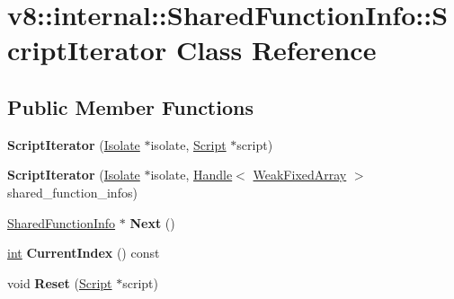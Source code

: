 \hypertarget{classv8_1_1internal_1_1SharedFunctionInfo_1_1ScriptIterator}{}\section{v8\+:\+:internal\+:\+:Shared\+Function\+Info\+:\+:Script\+Iterator Class Reference}
\label{classv8_1_1internal_1_1SharedFunctionInfo_1_1ScriptIterator}
\subsection*{Public Member Functions}
\begin{DoxyCompactItemize}
\item 
\mbox{\label{classv8_1_1internal_1_1SharedFunctionInfo_1_1ScriptIterator_a9ebf77e99f7ce26f5dbf5a3c0e1762b6}} 
{\bfseries Script\+Iterator} (\mbox{\hyperlink{classv8_1_1internal_1_1Isolate}{Isolate}} $\ast$isolate, \mbox{\hyperlink{classv8_1_1internal_1_1Script}{Script}} $\ast$script)
\item 
\mbox{\label{classv8_1_1internal_1_1SharedFunctionInfo_1_1ScriptIterator_ab111e55a87a371c950b7483582d91a85}} 
{\bfseries Script\+Iterator} (\mbox{\hyperlink{classv8_1_1internal_1_1Isolate}{Isolate}} $\ast$isolate, \mbox{\hyperlink{classv8_1_1internal_1_1Handle}{Handle}}$<$ \mbox{\hyperlink{classv8_1_1internal_1_1WeakFixedArray}{Weak\+Fixed\+Array}} $>$ shared\+\_\+function\+\_\+infos)
\item 
\mbox{\label{classv8_1_1internal_1_1SharedFunctionInfo_1_1ScriptIterator_a8d17725e40ea1472084ac244d40ece3a}} 
\mbox{\hyperlink{classv8_1_1internal_1_1SharedFunctionInfo}{Shared\+Function\+Info}} $\ast$ {\bfseries Next} ()
\item 
\mbox{\label{classv8_1_1internal_1_1SharedFunctionInfo_1_1ScriptIterator_a5e9eb89d470e1a82d263b87fbe2d3fc4}} 
\mbox{\hyperlink{classint}{int}} {\bfseries Current\+Index} () const
\item 
\mbox{\label{classv8_1_1internal_1_1SharedFunctionInfo_1_1ScriptIterator_a8640bfb6495dd6085d305a80ba2319bb}} 
void {\bfseries Reset} (\mbox{\hyperlink{classv8_1_1internal_1_1Script}{Script}} $\ast$script)
\end{DoxyCompactItemize}


